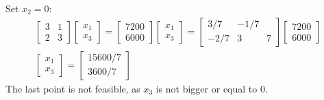Set $x_2=0$:
\begin{subequations}
    \begin{align}
        \begin{bmatrix}
            3 & 1\\ 
            2 & 3
        \end{bmatrix}\begin{bmatrix}
            x_1 \\ x_3
        \end{bmatrix}=\begin{bmatrix}
            7200\\6000
        \end{bmatrix}
        \begin{bmatrix}
            x_1 \\ x_3
        \end{bmatrix}=\begin{bmatrix}
            3/7 & -1/7\\ 
            -2/7 & 3&7
        \end{bmatrix}\begin{bmatrix}
            7200\\6000
        \end{bmatrix}\\ 
        \begin{bmatrix}
            x_1 \\ x_3
        \end{bmatrix} = \begin{bmatrix}
            15600/7 \\ 3600/7
        \end{bmatrix}
    \end{align}
\end{subequations}
The last point is not feasible, as $x_3$ is not bigger or equal to 0.
